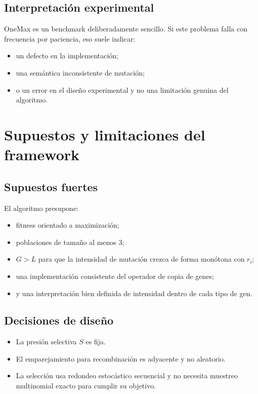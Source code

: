 \documentclass[11pt]{article}
\begin{document}
\subsection{Interpretaci\'on experimental}

OneMax es un benchmark deliberadamente sencillo. Si este problema falla con
frecuencia por paciencia, eso suele indicar:

\begin{itemize}
  \item un defecto en la implementaci\'on;
  \item una sem\'antica inconsistente de mutaci\'on;
  \item o un error en el dise\~no experimental y no una limitaci\'on genuina
  del algoritmo.
\end{itemize}

\section{Supuestos y limitaciones del framework}

\subsection{Supuestos fuertes}

El algoritmo presupone:

\begin{itemize}
  \item fitness orientado a maximizaci\'on;
  \item poblaciones de tama\~no al menos \(3\);
  \item \(G > L\) para que la intensidad de mutaci\'on crezca de forma
  mon\'otona con \(r_i\);
  \item una implementaci\'on consistente del operador de copia de genes;
  \item y una interpretaci\'on bien definida de intensidad dentro de cada tipo
  de gen.
\end{itemize}

\subsection{Decisiones de dise\~no}

\begin{itemize}
  \item La presi\'on selectiva \(S\) es fija.
  \item El emparejamiento para recombinaci\'on es adyacente y no aleatorio.
  \item La selecci\'on usa redondeo estoc\'astico secuencial y no necesita
  muestreo multinomial exacto para cumplir su objetivo.
\end{itemize}
\end{document}
